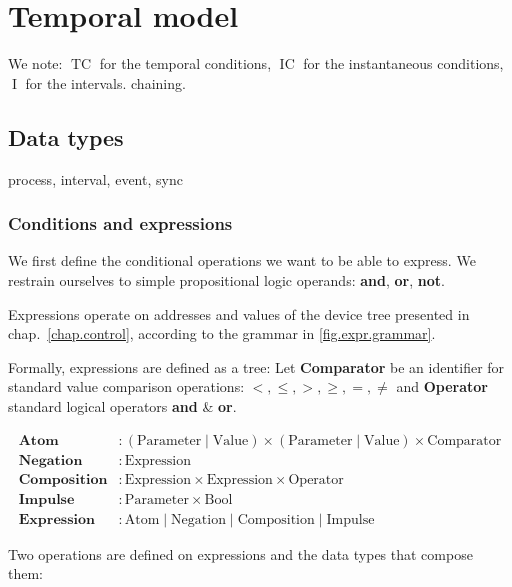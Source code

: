 \documentclass[applsci,article,submit,moreauthors,pdftex,10pt,a4paper]{mdpi}
\DeclareMathOperator{\tc}{TC}
\DeclareMathOperator{\ic}{IC}
\DeclareMathOperator{\itv}{I}
\begin{document}
\section{Temporal model}
We note: $\tc$ for the temporal conditions, $\ic$ for the instantaneous conditions, $\itv$ for the intervals.
chaining.
\subsection{Data types}
process, interval, event, sync



\subsubsection{Conditions and expressions}

We first define the conditional operations we want to be able to express.
We restrain ourselves to simple propositional logic operands: \textbf{and}, \textbf{or}, \textbf{not}.

Expressions operate on addresses and values of the device tree presented in chap.~\ref{chap.control}, according to the grammar in \ref{fig.expr.grammar}.

Formally, expressions are defined as a tree:
Let \textbf{Comparator} be an identifier for standard value comparison operations: $<, \leq, >, \geq, =, \neq$ and \textbf{Operator} standard logical operators \textbf{and} \&  \textbf{or}.

\begin{align*}
    \mathbf{Atom} & :  (\mathrm{Parameter} \mid \mathrm{Value}) \times (\mathrm{Parameter} \mid \mathrm{Value}) \times \mathrm{Comparator} \\
    \mathbf{Negation} & : \mathrm{Expression} \\
    \mathbf{Composition} & : \mathrm{Expression} \times \mathrm{Expression} \times \mathrm{Operator} \\
    \mathbf{Impulse} & : \mathrm{Parameter} \times \mathrm{Bool} \\
    \mathbf{Expression} &: \mathrm{Atom} \mid \mathrm{Negation} \mid \mathrm{Composition} \mid \mathrm{Impulse}
\end{align*}

Two operations are defined on expressions and the data types that compose them: 
\end{document}
